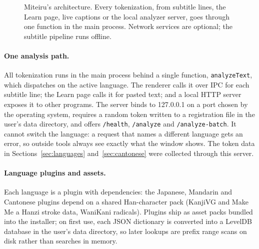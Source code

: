 ﻿\documentclass[11pt,a4paper]{article}
\begin{document}
\begin{figure}[t]
\caption{Miteiru's architecture. Every tokenization, from subtitle lines, the Learn page, live captions or the local analyzer server, goes through one function in the main process. Network services are optional; the subtitle pipeline runs offline.}
\label{fig:arch}
\end{figure}

\paragraph{One analysis path.}
All tokenization runs in the main process behind a single function, \texttt{analyzeText}, which dispatches on the active language. The renderer calls it over IPC for each subtitle line; the Learn page calls it for pasted text; and a local HTTP server exposes it to other programs. The server binds to 127.0.0.1 on a port chosen by the operating system, requires a random token written to a registration file in the user's data directory, and offers \texttt{/health}, \texttt{/analyze} and \texttt{/analyze-batch}. It cannot switch the language: a request that names a different language gets an error, so outside tools always see exactly what the window shows. The token data in Sections~\ref{sec:languages} and~\ref{sec:cantonese} were collected through this server.

\paragraph{Language plugins and assets.}
Each language is a plugin with dependencies: the Japanese, Mandarin and Cantonese plugins depend on a shared Han-character pack (KanjiVG and Make Me a Hanzi stroke data, WaniKani radicals). Plugins ship as asset packs bundled into the installer; on first use, each JSON dictionary is converted into a LevelDB database in the user's data directory, so later lookups are prefix range scans on disk rather than searches in memory.
\end{document}
